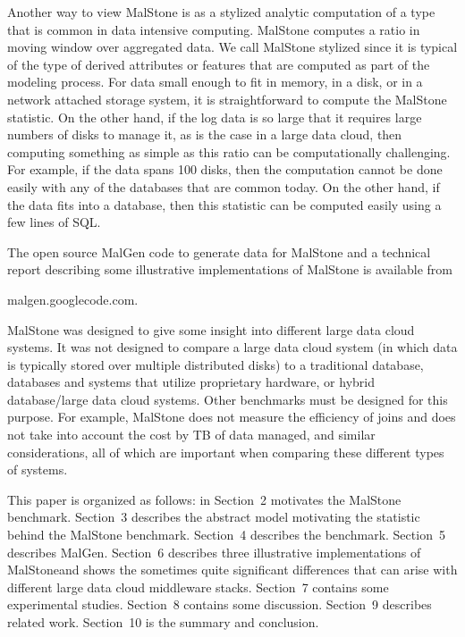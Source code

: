 \documentclass{acm_proc_article-sp}
\def\malstone{MalStone } \def\malgen{MalGen }
\def\malstonens{MalStone} \def\malgenns{MalGen}
\begin{document}
Another way to view \malstone is as a stylized analytic computation of
a type that is common in data intensive computing. \malstone computes
a ratio in moving window over aggregated data. We call \malstone
stylized since it is typical of the type of derived attributes or
features that are computed as part of the modeling process. For data
small enough to fit in memory, in a disk, or in a network attached
storage system, it is straightforward to compute the \malstone
statistic. On the other hand, if the log data is so large that it
requires large numbers of disks to manage it, as is the case in a
large data cloud, then computing something
as simple as this ratio can be computationally challenging. For
example, if the data spans 100 disks, then the computation cannot be
done easily with any of the databases that are common today. On the
other hand, if the data fits into a database, then this statistic can
be computed easily using a few lines of SQL.

The open source \malgen code to generate
data for \malstone and a technical report describing some illustrative
implementations of \malstone is available from 
\begin{center}
malgen.googlecode.com.
\end{center}

\malstone was designed to give some insight into different large data
cloud systems. It was not designed to compare a large data cloud
system (in which data is typically stored over multiple distributed
disks) to a traditional database, databases and systems that utilize
proprietary hardware, or hybrid database/large data cloud systems.
Other benchmarks must be designed for this purpose. For example,
\malstone does not measure the efficiency of joins and does not take
into account the cost by TB of data managed, and similar
considerations, all of which are important when comparing these
different types of systems.


This paper is organized as follows: in Section~2 motivates the
\malstone benchmark. Section~3 describes the abstract model motivating
the statistic behind the \malstone benchmark. Section~4 describes the
benchmark. Section~5 describes \malgenns. Section~6 describes three
illustrative implementations of \malstonens and shows the sometimes
quite significant differences that can arise with different large data
cloud middleware stacks. Section~7 contains some experimental studies.
Section~8 contains some discussion. Section~9 describes related work.
Section~10 is the summary and conclusion.
\end{document}

